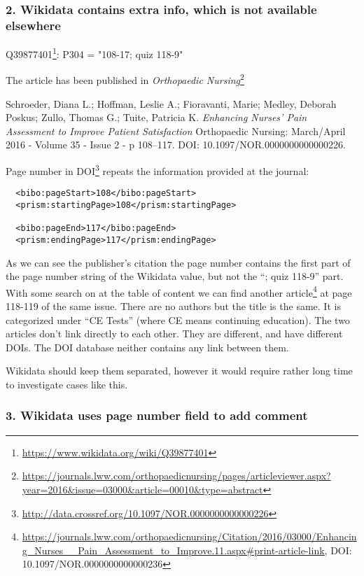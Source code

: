 \subsubsection{2. Wikidata contains extra info, which is not available elsewhere}

Q39877401\footnote{\url{https://www.wikidata.org/wiki/Q39877401}}: P304 = "108-17; quiz 118-9"

The article has been published in \emph{Orthopaedic Nursing}\footnote{\url{https://journals.lww.com/orthopaedicnursing/pages/articleviewer.aspx?year=2016&issue=03000&article=00010&type=abstract}}

Schroeder, Diana L.; Hoffman, Leslie A.; Fioravanti, Marie; Medley, Deborah Poskus; Zullo, Thomas G.; Tuite, Patricia K. \emph{Enhancing Nurses' Pain Assessment to Improve Patient Satisfaction} Orthopaedic Nursing: March/April 2016 - Volume 35 - Issue 2 - p 108–117. DOI: 10.1097/NOR.0000000000000226.

Page number in DOI\footnote{\url{http://data.crossref.org/10.1097/NOR.0000000000000226}} repeats the information provided at the journal:

\begin{lstlisting}
  <bibo:pageStart>108</bibo:pageStart>
  <prism:startingPage>108</prism:startingPage>

  <bibo:pageEnd>117</bibo:pageEnd>
  <prism:endingPage>117</prism:endingPage>
\end{lstlisting}

As we can see the publisher's citation the page number contains the first part of the page number string of the Wikidata value, but not the ``; quiz 118-9'' part. With some search on at the table of content we can find another article\footnote{\url{https://journals.lww.com/orthopaedicnursing/Citation/2016/03000/Enhancing_Nurses__Pain_Assessment_to_Improve.11.aspx#print-article-link}, DOI: {10.1097/NOR.0000000000000236}} at page 118-119 of the same issue. There are no authors but the title is the same. It is categorized under ``CE Tests'' (where CE means continuing education). The two articles don't link directly to each other. They are different, and have different DOIs. The DOI database neither contains any link between them.

Wikidata should keep them separated, however it would require rather long time to investigate cases like this.

\subsubsection{3. Wikidata uses page number field to add comment}

